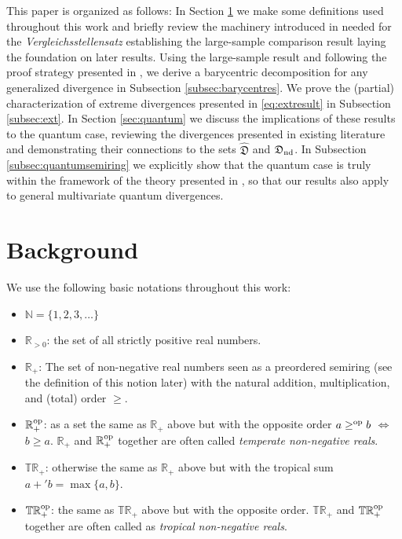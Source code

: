 \documentclass[12pt,a4paper,reqno]{amsart}
\theoremstyle{definition}
\newcommand{\mf}[1]{\mathfrak{#1}}
\newcommand{\N}{\mathbb N}
\newcommand{\R}{\mathbb R}
\newcommand{\T}{\mathbb T}
\begin{document}
This paper is organized as follows: In Section \ref{sec:Background} we make some definitions used throughout this work and briefly review the machinery introduced in \cite{FritzI,FritzII} needed for the {\it Vergleichsstellensatz} establishing the large-sample comparison result laying the foundation on later results. Using the large-sample result and following the proof strategy presented in \cite{Mu_et_al_2021}, we derive a barycentric decomposition for any generalized divergence in Subsection \ref{subsec:barycentres}. We prove the (partial) characterization of extreme divergences presented in \eqref{eq:extresult} in Subsection \ref{subsec:ext}. In Section \ref{sec:quantum} we discuss the implications of these results to the quantum case, reviewing the divergences presented in existing literature and demonstrating their connections to the sets $\hat{\mf D}$ and $\mf D_{\rm nd}$. In Subsection \ref{subsec:quantumsemiring} we explicitly show that the quantum case is truly within the framework of the theory presented in \cite{FritzI,FritzII}, so that our results also apply to general multivariate quantum divergences.

\section{Background}\label{sec:Background}

We use the following basic notations throughout this work:
\begin{itemize}
\item $\N=\{1,2,3,\ldots\}$
\item $\R_{>0}$: the set of all strictly positive real numbers.
\item $\R_+$: The set of non-negative real numbers seen as a preordered semiring (see the definition of this notion later) with the natural addition, multiplication, and (total) order $\geq$.
\item $\R_+^{\rm op}$: as a set the same as $\R_+$ above but with the opposite order $a\geq^{\rm op}b$ $\Leftrightarrow$ $b\geq a$. $\R_+$ and $\R_+^{\rm op}$ together are often called {\it temperate non-negative reals}.
\item $\T\R_+$: otherwise the same as $\R_+$ above but with the tropical sum $a+'b=\max\{a,b\}$.
\item $\T\R_+^{\rm op}$: the same as $\T\R_+$ above but with the opposite order. $\T\R_+$ and $\T\R_+^{\rm op}$ together are often called as {\it tropical non-negative reals}.
\end{itemize}
\end{document}
